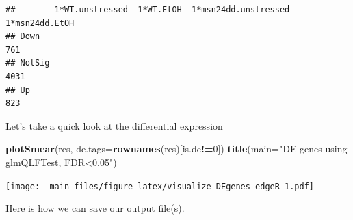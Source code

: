 \documentclass[
]{book}
\newenvironment{Shaded}{\begin{snugshade}}{\end{snugshade}}
\newcommand{\AttributeTok}[1]{\textcolor[rgb]{0.13,0.29,0.53}{#1}}
\newcommand{\DecValTok}[1]{\textcolor[rgb]{0.00,0.00,0.81}{#1}}
\newcommand{\FunctionTok}[1]{\textcolor[rgb]{0.13,0.29,0.53}{\textbf{#1}}}
\newcommand{\NormalTok}[1]{#1}
\newcommand{\SpecialCharTok}[1]{\textcolor[rgb]{0.81,0.36,0.00}{\textbf{#1}}}
\newcommand{\StringTok}[1]{\textcolor[rgb]{0.31,0.60,0.02}{#1}}
\begin{document}
\begin{verbatim}
##        1*WT.unstressed -1*WT.EtOH -1*msn24dd.unstressed 1*msn24dd.EtOH
## Down                                                               761
## NotSig                                                            4031
## Up                                                                 823
\end{verbatim}

Let's take a quick look at the differential expression

\begin{Shaded}
\begin{Highlighting}[]
\FunctionTok{plotSmear}\NormalTok{(res, }\AttributeTok{de.tags=}\FunctionTok{rownames}\NormalTok{(res)[is.de}\SpecialCharTok{!=}\DecValTok{0}\NormalTok{])}
\FunctionTok{title}\NormalTok{(}\AttributeTok{main=}\StringTok{"DE genes using glmQLFTest, FDR\textless{}0.05"}\NormalTok{)}
\end{Highlighting}
\end{Shaded}

\texttt{[image: \_main\_files/figure-latex/visualize-DEgenes-edgeR-1.pdf]}

Here is how we can save our output file(s).
\end{document}
